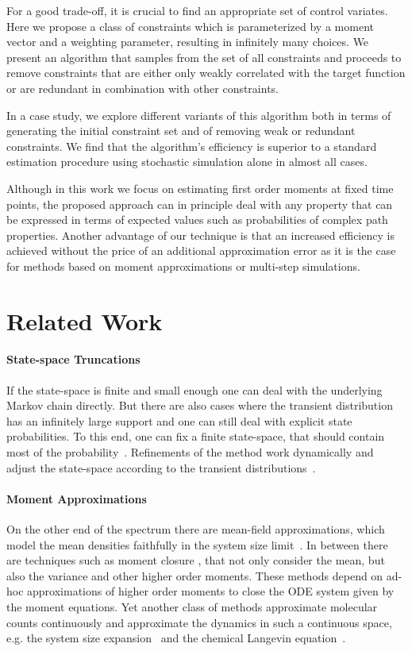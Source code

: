 For a good trade-off, it is crucial to find an appropriate set of
control variates.
Here we propose a class of constraints which is parameterized by a moment vector
and a weighting parameter, resulting in infinitely many choices.
We present an algorithm that samples from the set of all constraints and
proceeds to remove constraints that are either only weakly correlated with the
target function or are redundant in combination with other constraints.

In a case study, we explore different variants of this algorithm
both in terms of generating the initial constraint set and of
removing  weak or redundant constraints.
We find that the algorithm's efficiency is superior to a standard
estimation procedure
using stochastic simulation alone
in almost all cases.

Although in this work we focus on  estimating first order moments at
fixed time points, the proposed approach can in principle deal with
any property that can
be expressed in terms of expected values such as probabilities
of complex path properties.
Another advantage of our technique is that an increased efficiency is
achieved without the price of an additional approximation error as it
is the case for methods based on moment approximations or multi-step
simulations.

\section{Related Work}\label{sec:cv:related}
\paragraph{State-space Truncations}
If the state-space is finite and small enough one can deal with the
underlying Markov
chain directly.
But there are also  cases where the transient distribution has an
infinitely large support
and one can still deal with explicit state probabilities.
To this end, one can fix a finite state-space, that should contain most of the
probability~\parencite{munsky2006finite}. Refinements of the method work
dynamically and adjust the state-space according to the transient
distributions~\parencite{andreychenko2011parameter,henzinger2009sliding,mateescu2010fast}.

\paragraph{Moment Approximations}
On the other end of the spectrum there are mean-field approximations,
which model the mean densities faithfully in the system size
limit~\parencite{bortolussi2013continuous}.
In between there are techniques such as moment closure
\parencite{singh2006lognormal}, that
not only consider the mean, but also the variance and other higher
order moments.
These methods depend on ad-hoc approximations of higher order moments to
close the \ac{ODE} system given by the moment equations.
Yet another class of methods approximate molecular counts
continuously and approximate the dynamics in such a continuous space,
e.g. the system size expansion~\parencite{van1992stochastic} and the
chemical Langevin equation~\parencite{gillespie2000chemical}.

